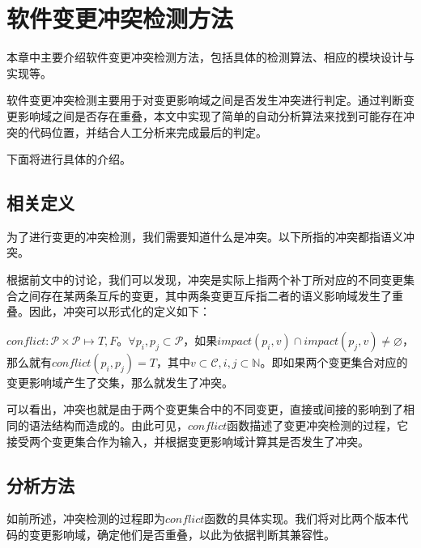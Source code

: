 \chapter{软件变更冲突检测方法}
\label {chap_conflict}

本章中主要介绍软件变更冲突检测方法，包括具体的检测算法、相应的模块设计与实现等。

软件变更冲突检测主要用于对变更影响域之间是否发生冲突进行判定。通过判断变更影响域之间是否存在重叠，本文中实现了简单的自动分析算法来找到可能存在冲突的代码位置，并结合人工分析来完成最后的判定。

下面将进行具体的介绍。

\section{相关定义}

\label {conflict_define}

为了进行变更的冲突检测，我们需要知道什么是冲突。以下所指的冲突都指语义冲突。

根据前文中的讨论，我们可以发现，冲突是实际上指两个补丁所对应的不同变更集合之间存在某两条互斥的变更，其中两条变更互斥指二者的语义影响域发生了重叠。因此，冲突可以形式化的定义如下：

\begin{definition}
	$conflict:\mathcal{P} \times \mathcal{P} \mapsto {T,F}$。$\forall p_i,p_j \subset \mathcal{P}$，如果$impact(p_i,v) \cap impact(p_j,v) \neq \varnothing$，那么就有$conflict(p_i,p_j) = T$，其中$v \subset \mathcal{C},i,j \subset \mathbb{N}$。即如果两个变更集合对应的变更影响域产生了交集，那么就发生了冲突。
\end{definition}

可以看出，冲突也就是由于两个变更集合中的不同变更，直接或间接的影响到了相同的语法结构而造成的。由此可见，$conflict$函数描述了变更冲突检测的过程，它接受两个变更集合作为输入，并根据变更影响域计算其是否发生了冲突。

\section{分析方法}
\label {chap_conflict}

如前所述，冲突检测的过程即为$conflict$函数的具体实现。我们将对比两个版本代码的变更影响域，确定他们是否重叠，以此为依据判断其兼容性。

%

